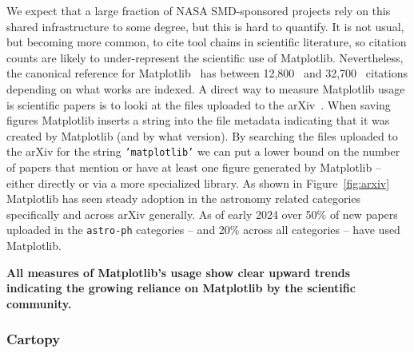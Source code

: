 \documentclass[12pt]{article}
\numberwithin{page}{section}
\begin{document}
We expect that a large fraction of NASA SMD-sponsored projects rely on this
shared infrastructure to some degree, but this is hard to quantify.  It is not
usual, but becoming more common, to cite tool chains in scientific literature,
so citation counts are likely to under-represent the scientific use of
Matplotlib.  Nevertheless, the canonical reference for
Matplotlib~\cite{Hunter:2007} has between 12,800~\cite{ads_mpl} and
32,700~\cite{gs_cites} citations depending on what works are indexed.  A direct
way to measure Matplotlib usage is scientific papers is to looki at the files
uploaded to the arXiv~\cite{arxiv_stats}.  When saving figures Matplotlib
inserts a string into the file metadata indicating that it was created by
Matplotlib (and by what version).  By searching the files uploaded to the arXiv
for the string \texttt{'matplotlib'} we can put a lower bound
on the number of papers that mention or have at least one figure generated by
Matplotlib -- either directly or via a more specialized library.  As shown in
Figure~\ref{fig:arxiv} Matplotlib has seen steady adoption in the astronomy
related categories specifically and across arXiv generally.  As of early 2024
over 50\% of new papers uploaded in the \texttt{astro-ph} categories -- and
20\% across all categories -- have used Matplotlib.

\textbf{All measures of Matplotlib's usage show clear upward trends indicating the
growing reliance on Matplotlib by the scientific community.}

\subsubsection{Cartopy}


\end{document}
